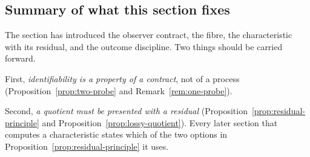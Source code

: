 \subsection{Summary of what this section fixes}

The section has introduced the observer contract, the fibre, the characteristic with
its residual, and the outcome discipline.  Two things should be carried forward.

First, \emph{identifiability is a property of a contract}, not of a process
(Proposition~\ref{prop:two-probe} and Remark~\ref{rem:one-probe}).

Second, \emph{a quotient must be presented with a residual}
(Proposition~\ref{prop:residual-principle} and
Proposition~\ref{prop:lossy-quotient}).  Every later section that computes a
characteristic states which of the two options in
Proposition~\ref{prop:residual-principle} it uses.
